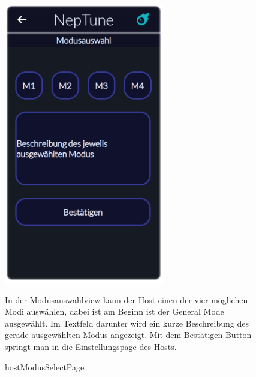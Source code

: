 \documentclass[oneside, ngerman]{sdqtechreport}
\begin{document}
\begin{figure}
    \hypertarget{hostModusSelectPage}{}
    \begin{minipage}[t]{7 cm}
        \vspace{-1.5ex}
        \includegraphics[width=7cm]{LATEX/Pflichtenheft/GraphicDesigns/hostModusSelectPage.png}
        \caption{hostModusSelectPage}
    \end{minipage}
    \hspace{1cm}
    \begin{minipage}[t]{7 cm}
        \vspace{1cm}
        In der Modusauswahlview kann der Host einen der vier möglichen Modi auswählen, dabei ist am Beginn ist der General Mode ausgewählt. Im Textfeld darunter wird ein kurze Beschreibung des gerade ausgewählten Modus angezeigt. Mit dem Bestätigen Button springt man in die Einstellungspage des Hosts.
    \end{minipage}
\end{figure}
\end{document}
